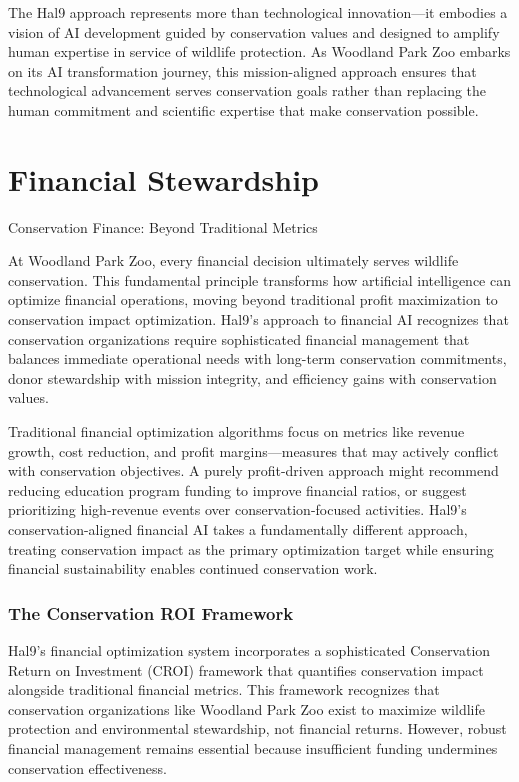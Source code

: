 \documentclass[
  Letterpaper,
]{scrbook}
\begin{document}
The Hal9 approach represents more than technological innovation---it
embodies a vision of AI development guided by conservation values and
designed to amplify human expertise in service of wildlife protection.
As Woodland Park Zoo embarks on its AI transformation journey, this
mission-aligned approach ensures that technological advancement serves
conservation goals rather than replacing the human commitment and
scientific expertise that make conservation possible.


\chapter{Financial Stewardship}\label{financial-stewardship}

Conservation Finance: Beyond Traditional Metrics

\hfill\break

At Woodland Park Zoo, every financial decision ultimately serves
wildlife conservation. This fundamental principle transforms how
artificial intelligence can optimize financial operations, moving beyond
traditional profit maximization to conservation impact optimization.
Hal9's approach to financial AI recognizes that conservation
organizations require sophisticated financial management that balances
immediate operational needs with long-term conservation commitments,
donor stewardship with mission integrity, and efficiency gains with
conservation values.

Traditional financial optimization algorithms focus on metrics like
revenue growth, cost reduction, and profit margins---measures that may
actively conflict with conservation objectives. A purely profit-driven
approach might recommend reducing education program funding to improve
financial ratios, or suggest prioritizing high-revenue events over
conservation-focused activities. Hal9's conservation-aligned financial
AI takes a fundamentally different approach, treating conservation
impact as the primary optimization target while ensuring financial
sustainability enables continued conservation work.

\subsection{The Conservation ROI
Framework}\label{the-conservation-roi-framework}

Hal9's financial optimization system incorporates a sophisticated
Conservation Return on Investment (CROI) framework that quantifies
conservation impact alongside traditional financial metrics. This
framework recognizes that conservation organizations like Woodland Park
Zoo exist to maximize wildlife protection and environmental stewardship,
not financial returns. However, robust financial management remains
essential because insufficient funding undermines conservation
effectiveness.
\end{document}
